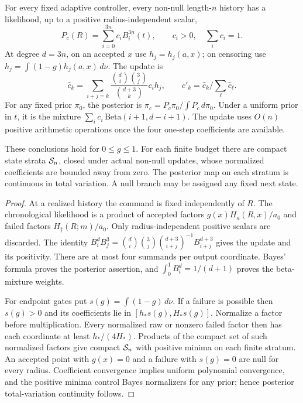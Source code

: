 \begin{theorem}\label{thm:filter}
For every fixed adaptive controller, every non-null length-$n$ history has a likelihood, up to a positive radius-independent scalar,
\[
 P_c(R)=\sum_{i=0}^{3n}c_iB_i^{3n}(t),\qquad c_i>0,\quad\sum_i c_i=1.
\]
At degree $d=3n$, on an accepted $x$ use $h_j=h_j(a,x)$; on censoring use $h_j=\int(1-g)h_j(a,x)\,d\nu$. The update is
\begin{equation}
 \widehat c_k=\sum_{i+j=k}\frac{\binom di\binom3j}{\binom{d+3}k}c_i h_j,
 \qquad c'_k=\widehat c_k/\sum_\ell\widehat c_\ell.
 \label{eq:update}
\end{equation}
For any fixed prior $\pi_0$, the posterior is
$\pi_c=P_c\pi_0/\int P_c\,d\pi_0$. Under a uniform prior in $t$, it is the mixture $\sum_i c_i\,\mathrm{Beta}(i+1,d-i+1)$. The update uses $O(n)$ positive arithmetic operations once the four one-step coefficients are available.

These conclusions hold for $0\le g\le1$. For each finite budget there are compact state strata $\mathcal S_n$, closed under actual non-null updates, whose normalized coefficients are bounded away from zero. The posterior map on each stratum is continuous in total variation. A null branch may be assigned any fixed next state.
\end{theorem}
\begin{proof}
At a realized history the command is fixed independently of $R$. The chronological likelihood is a product of accepted factors $g(x)H_a(R,x)/a_0$ and failed factors $H_\dagger(R;m)/a_0$. Only radius-independent positive scalars are discarded. The identity
$B_i^dB_j^3=\binom di\binom3j\binom{d+3}{i+j}^{-1}B_{i+j}^{d+3}$ gives the update and its positivity. There are at most four summands per output coordinate. Bayes' formula proves the posterior assertion, and $\int_0^1B_i^d=1/(d+1)$ proves the beta-mixture weights.

For endpoint gates put $s(g)=\int(1-g)\,d\nu$. If a failure is possible then $s(g)>0$ and its coefficients lie in $[h_*s(g),H_*s(g)]$. Normalize a factor before multiplication. Every normalized raw or nonzero failed factor then has each coordinate at least $h_*/(4H_*)$. Products of the compact set of such normalized factors give compact $\mathcal S_n$ with positive minima on each finite stratum. An accepted point with $g(x)=0$ and a failure with $s(g)=0$ are null for every radius. Coefficient convergence implies uniform polynomial convergence, and the positive minima control Bayes normalizers for any prior; hence posterior total-variation continuity follows.
\end{proof}

